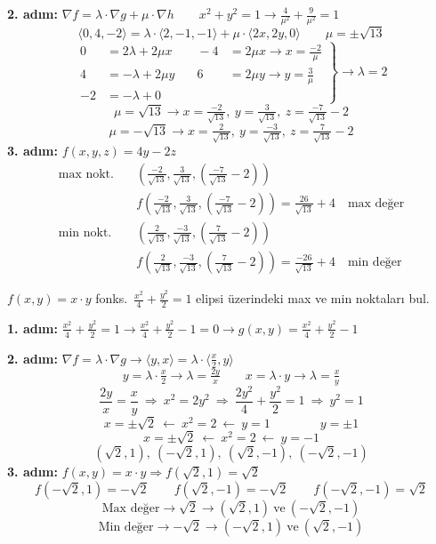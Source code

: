 \documentclass[11pt,a4paper]{article}
\begin{document}
\noindent\textbf{2. adım:} $\nabla f=\lambda\cdot\nabla g+\mu\cdot\nabla h\qquad x^2+y^2=1\longrightarrow \tfrac{4}{\mu^2}+\tfrac{9}{\mu^2}=1$
\[ \langle 0,4,-2\rangle=\lambda\cdot\langle 2,-1,-1\rangle+\mu\cdot\langle 2x,2y,0\rangle\qquad \mu=\pm\sqrt{13} \]
\[ \left.\begin{aligned} 0&=2\lambda+2\mu x &\quad -4&=2\mu x\longrightarrow x=\tfrac{-2}{\mu}\\ 4&=-\lambda+2\mu y &\quad 6&=2\mu y\longrightarrow y=\tfrac{3}{\mu}\\ -2&=-\lambda+0 \end{aligned}\right\}\longrightarrow \lambda=2 \]
\[ \mu=\sqrt{13}\longrightarrow x=\tfrac{-2}{\sqrt{13}},\ y=\tfrac{3}{\sqrt{13}},\ z=\tfrac{-7}{\sqrt{13}}-2 \]
\[ \mu=-\sqrt{13}\longrightarrow x=\tfrac{2}{\sqrt{13}},\ y=\tfrac{-3}{\sqrt{13}},\ z=\tfrac{7}{\sqrt{13}}-2 \]
\noindent\textbf{3. adım:} $f(x,y,z)=4y-2z$
\begin{align*}
\text{max nokt.}\quad&\left(\tfrac{-2}{\sqrt{13}},\tfrac{3}{\sqrt{13}},\left(\tfrac{-7}{\sqrt{13}}-2\right)\right)\\
&f\!\left(\tfrac{-2}{\sqrt{13}},\tfrac{3}{\sqrt{13}},\left(\tfrac{-7}{\sqrt{13}}-2\right)\right)=\tfrac{26}{\sqrt{13}}+4\quad\text{max değer}\\
\text{min nokt.}\quad&\left(\tfrac{2}{\sqrt{13}},\tfrac{-3}{\sqrt{13}},\left(\tfrac{7}{\sqrt{13}}-2\right)\right)\\
&f\!\left(\tfrac{2}{\sqrt{13}},\tfrac{-3}{\sqrt{13}},\left(\tfrac{7}{\sqrt{13}}-2\right)\right)=\tfrac{-26}{\sqrt{13}}+4\quad\text{min değer}
\end{align*}

\begin{ornek}
$f(x,y)=x\cdot y$ fonks.\ $\frac{x^2}{4}+\frac{y^2}{2}=1$ elipsi üzerindeki max ve min noktaları bul.
\end{ornek}
\noindent\textbf{1. adım:} $\frac{x^2}{4}+\frac{y^2}{2}=1\longrightarrow \frac{x^2}{4}+\frac{y^2}{2}-1=0\longrightarrow g(x,y)=\frac{x^2}{4}+\frac{y^2}{2}-1$

\noindent\textbf{2. adım:} $\nabla f=\lambda\cdot\nabla g\longrightarrow\langle y,x\rangle=\lambda\cdot\langle \tfrac{x}{2},y\rangle$
\[ y=\lambda\cdot\tfrac{x}{2}\longrightarrow\lambda=\tfrac{2y}{x}\qquad x=\lambda\cdot y\longrightarrow\lambda=\tfrac{x}{y} \]
\[ \frac{2y}{x}=\frac{x}{y}\ \Longrightarrow\ x^2=2y^2\ \Longrightarrow\ \frac{2y^2}{4}+\frac{y^2}{2}=1\ \Longrightarrow\ y^2=1 \]
\[ x=\pm\sqrt2\ \longleftarrow\ x^2=2\ \longleftarrow\ y=1\qquad\qquad y=\pm1 \]
\[ x=\pm\sqrt2\ \longleftarrow\ x^2=2\ \longleftarrow\ y=-1 \]
\[ (\sqrt2,1),\ (-\sqrt2,1),\ (\sqrt2,-1),\ (-\sqrt2,-1) \]
\noindent\textbf{3. adım:} $f(x,y)=x\cdot y\Longrightarrow f(\sqrt2,1)=\sqrt2$
\[ f(-\sqrt2,1)=-\sqrt2\qquad f(\sqrt2,-1)=-\sqrt2\qquad f(-\sqrt2,-1)=\sqrt2 \]
\[ \text{Max değer}\longrightarrow\sqrt2\longrightarrow(\sqrt2,1)\ \text{ve}\ (-\sqrt2,-1) \]
\[ \text{Min değer}\longrightarrow-\sqrt2\longrightarrow(-\sqrt2,1)\ \text{ve}\ (\sqrt2,-1) \]
\end{document}
